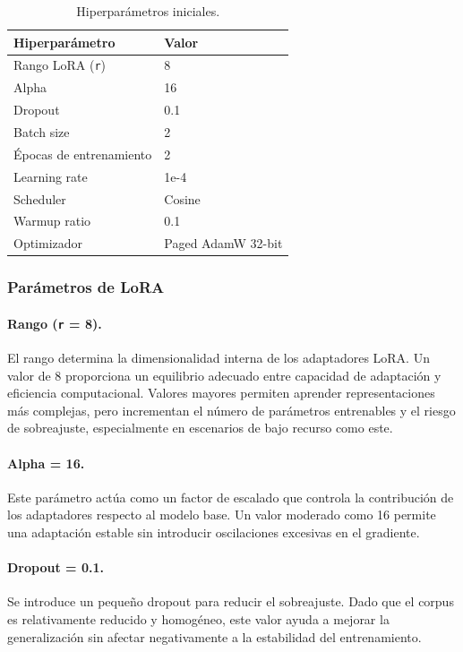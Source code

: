 \begin{table}[H]
\centering
\begin{tabular}{l l}
\hline
\textbf{Hiperparámetro} & \textbf{Valor} \\
\hline
Rango LoRA (\texttt{r}) & 8 \\
Alpha & 16 \\
Dropout & 0.1 \\
Batch size & 2 \\
Épocas de entrenamiento & 2 \\
Learning rate & 1e-4 \\
Scheduler & Cosine \\
Warmup ratio & 0.1 \\
Optimizador & Paged AdamW 32-bit \\
\hline
\end{tabular}
\caption{Hiperparámetros iniciales.}
\label{tab:hiperparametros_iniciales}
\end{table}

\subsubsection{Parámetros de LoRA}

\paragraph{Rango (\texttt{r} = 8).}
El rango determina la dimensionalidad interna de los adaptadores LoRA. Un valor de 8 proporciona un equilibrio adecuado entre capacidad de adaptación y eficiencia computacional. Valores mayores permiten aprender representaciones más complejas, pero incrementan el número de parámetros entrenables y el riesgo de sobreajuste, especialmente en escenarios de bajo recurso como este.

\paragraph{Alpha = 16.}
Este parámetro actúa como un factor de escalado que controla la contribución de los adaptadores respecto al modelo base. Un valor moderado como 16 permite una adaptación estable sin introducir oscilaciones excesivas en el gradiente.

\paragraph{Dropout = 0.1.}
Se introduce un pequeño dropout para reducir el sobreajuste. Dado que el corpus es relativamente reducido y homogéneo, este valor ayuda a mejorar la generalización sin afectar negativamente a la estabilidad del entrenamiento.

